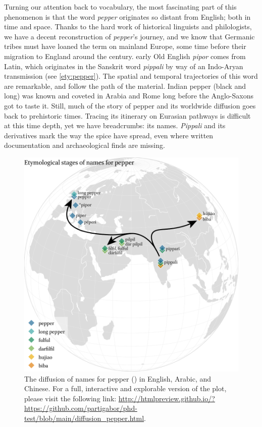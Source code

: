 Turning our attention back to vocabulary, the most fascinating part of this phenomenon is that the word \textit{pepper} originates so distant from English; both in time and space. Thanks to the hard work of historical linguists and philologists, we have a decent reconstruction of \textit{pepper}'s journey, and we know that Germanic tribes must have loaned the term on mainland Europe, some time before their migration to England around the  century. early Old English \textit{pipor} comes from Latin, which originates in the Sanskrit word \textit{pippali} by way of an Indo-Aryan transmission (see \ref{ety:pepper}). The spatial and temporal trajectories of this word are remarkable, and follow the path of the material. Indian pepper (black and long) was known and coveted in Arabia and Rome long before the Anglo-Saxons got to taste it. Still, much of the story of pepper and its worldwide diffusion goes back to prehistoric times. Tracing its itinerary on Eurasian pathways is difficult at this time depth, yet we have breadcrumbs: its names. \textit{Pippali} and its derivatives mark the way the spice have spread, even where written documentation and archaeological finds are missing.

\begin{figure}[!ht]
    \centering
    \includegraphics[width=\linewidth]{imgs/plots/diffusion_pepper_edited.pdf}
    \caption[The diffusion of names for pepper.]{The diffusion of names for pepper () in English, Arabic, and Chinese. For a full, interactive and explorable version of the plot, please visit the following link: \url{http://htmlpreview.github.io/?https://github.com/partigabor/phd-test/blob/main/diffusion_pepper.html}.}
    \label{fig:diffusion_pepper}
\end{figure}

